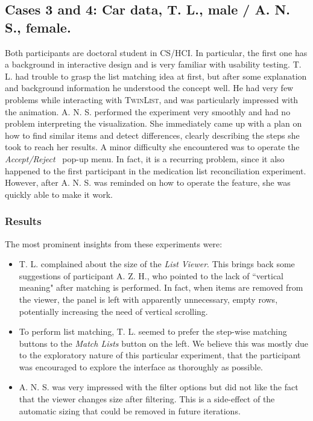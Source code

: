 \documentclass{chi2009}
\newcommand{\TwinList}{\textsc{TwinList}}
\newcommand{\ListViewer}{\textit{List Viewer}}
\newcommand{\AcceptReject}{\textit{Accept/Reject}}
\begin{document}
\subsection{Cases 3 and 4: Car data, T. L., male / A. N. S., female.}

Both participants are doctoral student in CS/HCI. In particular, the first one has a background in interactive design and is very familiar with usability testing. T. L. had trouble to grasp the list matching idea at first, but after some explanation and background information he understood the concept well. He had very few problems while interacting with \TwinList, and was particularly impressed with the animation. A. N. S. performed the experiment very smoothly and had no problem interpreting the visualization. She immediately came up with a plan on how to find similar items and detect differences, clearly describing the steps she took to reach her results. A minor difficulty she encountered was to operate the \AcceptReject~ pop-up menu. In fact, it is a recurring problem, since it also happened to the first participant in the medication list reconciliation experiment. However, after A. N. S. was reminded on how to operate the feature, she was quickly able to make it work. 

\subsubsection{Results}
The most prominent insights from these experiments were:
\begin{itemize}
\item T. L. complained about the size of the \ListViewer. This brings back some suggestions of participant A. Z. H., who pointed to the lack of ``vertical meaning" after matching is performed. In fact, when items are removed from the viewer, the panel is left with apparently unnecessary, empty rows, potentially increasing the need of vertical scrolling. 
\item To perform list matching, T. L. seemed to prefer the step-wise matching buttons to the \textit{Match Lists} button on the left. We believe this was mostly due to the exploratory nature of this particular experiment, that the participant was encouraged to explore the interface as thoroughly as possible.
\item A. N. S. was very impressed with the filter options but did not like the fact that the viewer changes size after filtering. This is a side-effect of the automatic sizing that could be removed in future iterations.
\end{itemize}
\end{document}
